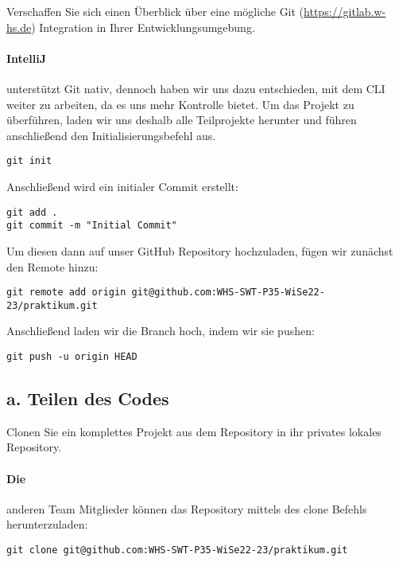 Verschaffen Sie sich einen Überblick über eine mögliche Git
(\href{https://gitlab.w-hs.de}{https://gitlab.w-hs.de}) Integration in Ihrer Entwicklungsumgebung.

\paragraph{IntelliJ} unterstützt Git nativ, dennoch haben wir uns dazu entschieden, mit dem CLI weiter zu arbeiten, da es uns mehr Kontrolle bietet.
Um das Projekt zu überführen, laden wir uns deshalb alle Teilprojekte herunter und führen anschließend den Initialisierungsbefehl aus.
\begin{lstlisting}[label={lst:git-initialize}, caption={Initialisieren eines leeren Git Repositories}]
git init
\end{lstlisting}

Anschließend wird ein initialer Commit erstellt:
\begin{lstlisting}[caption={Inizialen Commit erstellen},label={lst:initial-commit}]
git add .
git commit -m "Initial Commit"
\end{lstlisting}

Um diesen dann auf unser GitHub Repository hochzuladen, fügen wir zunächst den Remote hinzu:
\begin{lstlisting}[label={lst:add-remote}, caption={Hinzufügen eines Remotes}]
git remote add origin git@github.com:WHS-SWT-P35-WiSe22-23/praktikum.git
\end{lstlisting}

Anschließend laden wir die Branch hoch, indem wir sie pushen:
\begin{lstlisting}[label={lst:first-push}, caption={Erster push}]
git push -u origin HEAD
\end{lstlisting}

\subsection{a. Teilen des Codes}\label{subsec:a.-teilen-des-codes}
Clonen Sie ein komplettes Projekt aus dem Repository in ihr privates lokales Repository.

\paragraph{Die} anderen Team Mitglieder können das Repository mittels des clone Befehls herunterzuladen:
\begin{lstlisting}[label={lst:clone}, caption={Clonen des Repositories}]
git clone git@github.com:WHS-SWT-P35-WiSe22-23/praktikum.git
\end{lstlisting}

